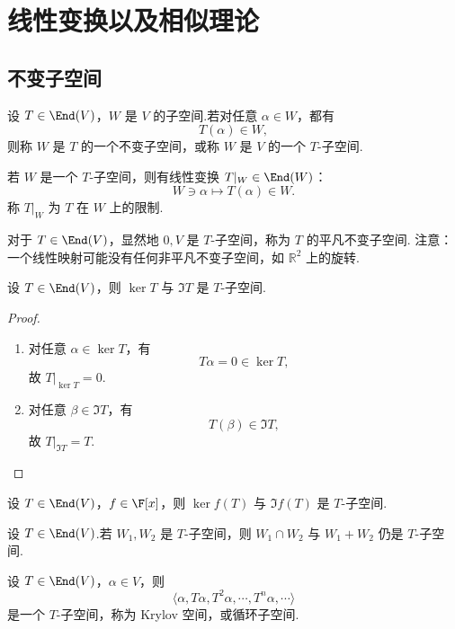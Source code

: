 \setchapterintro{}
\chapter{线性变换以及相似理论}

\section{不变子空间}

\begin{definition}
	设 $T\in\End(V)$，$W$ 是 $V$ 的子空间.若对任意 $\alpha\in W$，都有
	\[
	T(\alpha)\in W,
	\]
	则称 $W$ 是 $T$ 的一个不变子空间，或称 $W$ 是 $V$ 的一个 $T$-子空间.
	
	若 $W$ 是一个 $T$-子空间，则有线性变换 $T|_W\in\End(W)$：
	\[
	W\ni\alpha\longmapsto T(\alpha)\in W.
	\]
	称 $T|_W$ 为 $T$ 在 $W$ 上的限制.
\end{definition}

对于 $T\in\End(V)$，显然地 $0,V$ 是 $T$-子空间，称为 $T$ 的平凡不变子空间.
注意：一个线性映射可能没有任何非平凡不变子空间，如 $\mathbb{R}^2$ 上的旋转.

\begin{proposition}
	设 $T\in\End(V)$，则 $\ker T$ 与 $\Im T$ 是 $T$-子空间.
\end{proposition}

\begin{proof}
	\begin{enumerate}
	\item 对任意 $\alpha\in\ker T$，有
	\[
	T\alpha=0\in\ker T,
	\]
	故 $T|_{\ker T}=0$.
	
	\item 对任意 $\beta\in\Im T$，有
	\[
	T(\beta)\in\Im T,
	\]
	故 $T|_{\Im T}=T$.
\end{enumerate}
\end{proof}


\begin{corollary}
设 $T\in\End(V)$，$f\in\F[x]$，则 $\ker f(T)$ 与 $\Im f(T)$ 是 $T$-子空间.
\end{corollary}

\begin{example}
设 $T\in\End(V)$.若 $W_1,W_2$ 是 $T$-子空间，则 $W_1\cap W_2$ 与 $W_1+W_2$ 仍是 $T$-子空间.
\end{example}

\begin{example}
设 $T\in\End(V)$，$\alpha\in V$，则
\[
\langle \alpha,T\alpha,T^2\alpha,\cdots,T^n\alpha,\cdots\rangle
\]
是一个 $T$-子空间，称为 Krylov 空间，或循环子空间.
\end{example}

